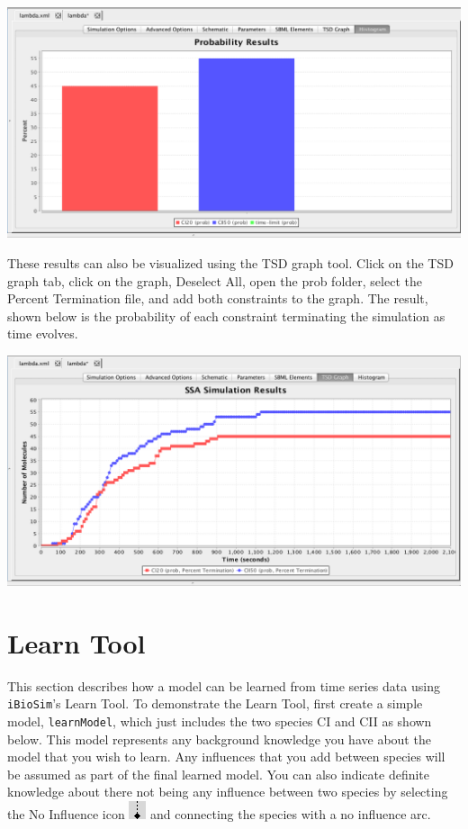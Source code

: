 \documentclass[titlepage,11pt]{article}
\begin{document}
\begin{center} 
\includegraphics[width=160mm]{screenshots/probResults}
\end{center}

These results can also be visualized using the TSD graph tool.  Click on the TSD graph tab, click on the graph, Deselect All, open the prob folder, select the Percent Termination file, and add both constraints to the graph.  The result, shown below is the probability of each constraint terminating the simulation as time evolves.  

\begin{center} 
\includegraphics[width=160mm]{screenshots/probResultsTSD}
\end{center}

\section{Learn Tool}

This section describes how a model can be learned from time series data using {\tt iBioSim}'s Learn Tool.  To demonstrate the Learn Tool, first create a simple model, {\tt learnModel}, which just includes the two species CI and CII as shown below.  This model represents any background knowledge you have about the model that you wish to learn.  Any influences that you add between species will be assumed as part of the final learned model.  You can also indicate definite knowledge about there not being any influence between two species by selecting the No Influence icon 
\includegraphics{../gui/icons/modelview/no_influence_selected} and connecting the species with a no influence arc.
\end{document}
